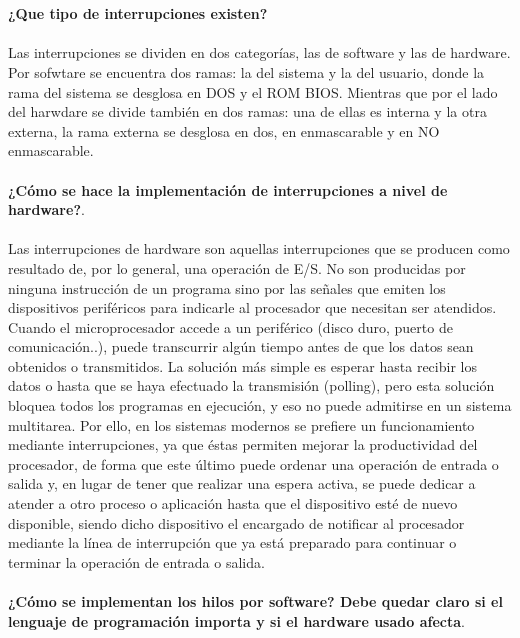 \documentclass[12pt]{article}
\begin{document}
\noindent\\
\\
\textbf{¿Que tipo de interrupciones existen?}\\
\\
Las interrupciones se dividen en dos categorías, las de software y las de hardware.
Por sofwtare se encuentra dos ramas: la del sistema y la del usuario, donde la rama del sistema se desglosa en DOS y el ROM BIOS.
Mientras que por el lado del harwdare se divide también en dos ramas: una de ellas es interna y la otra externa, la rama externa se desglosa en dos, en enmascarable y en NO enmascarable.
\\
\noindent
\\
\textbf{¿Cómo se hace la implementación de interrupciones a nivel de hardware?}.\\
\noindent
\\ 
Las interrupciones de hardware son aquellas interrupciones que se producen como resultado de, por lo general, una operación de E/S. No son producidas por ninguna instrucción de un programa sino por las señales que emiten los dispositivos periféricos para indicarle al procesador que necesitan ser atendidos.
Cuando el microprocesador accede a un periférico (disco duro, puerto de comunicación..), puede transcurrir algún tiempo antes de que los datos sean obtenidos o transmitidos. La solución más simple es esperar hasta recibir los datos o hasta que se haya efectuado la transmisión (polling), pero esta solución bloquea todos los programas en ejecución, y eso no puede admitirse en un sistema multitarea. Por ello, en los sistemas modernos se prefiere un funcionamiento mediante interrupciones, ya que éstas permiten mejorar la productividad del procesador, de forma que este último puede ordenar una operación de entrada o salida y, en lugar de tener que realizar una espera activa, se puede dedicar a atender a otro proceso o aplicación hasta que el dispositivo esté de nuevo disponible, siendo dicho dispositivo el encargado de notificar al procesador mediante la línea de interrupción que ya está preparado para continuar o terminar la operación de entrada o salida.\\
\noindent
\\
\textbf{¿Cómo se implementan los hilos por software? Debe quedar claro si el lenguaje de programación importa y si el hardware usado afecta}.\\
\noindent
\\
\end{document}
